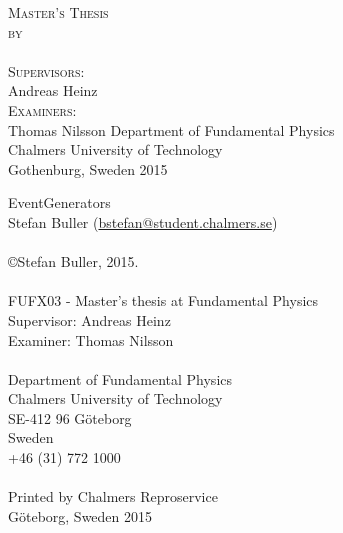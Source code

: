 \thispagestyle{empty}
\begin{titlepage}

\begin{center}
\vspace*{0.5cm}
\huge{\textbf{\thetitle }}
\vspace*{1.5cm}

\Large{\textsc{Master's Thesis}}\\
\vspace*{1cm}
\large{\textsc {by}}\\
\vspace*{0.4cm}
\LARGE{\theauthor}\\
\vspace*{1.2cm}
\Large{\textsc{Supervisors:}}\\
\vspace*{0.4cm}
\LARGE{Andreas Heinz}\\
\vspace*{1.0cm}
\Large{\textsc{Examiners:}}\\
\vspace*{0.4cm}
\LARGE{Thomas Nilsson}
\vfill
\large{Department of Fundamental Physics \\
	Chalmers University of Technology \\
	Gothenburg, Sweden 2015}
\end{center}

\end{titlepage}
\clearpage
\noindent EventGenerators\\
\noindent Stefan Buller (\href{mailto:bstefan@student.chalmers.se}{bstefan@student.chalmers.se})\\\\
\copyright Stefan Buller, 2015.\\\\
FUFX03  - Master's thesis at Fundamental Physics\\
Supervisor: Andreas Heinz\\
Examiner: Thomas Nilsson\\\\
Department of Fundamental Physics\\
Chalmers University of Technology\\
SE-412 96 Göteborg\\
Sweden\\
+46 (31) 772 1000\\\\
Printed by Chalmers Reproservice\\
Göteborg, Sweden 2015
 
